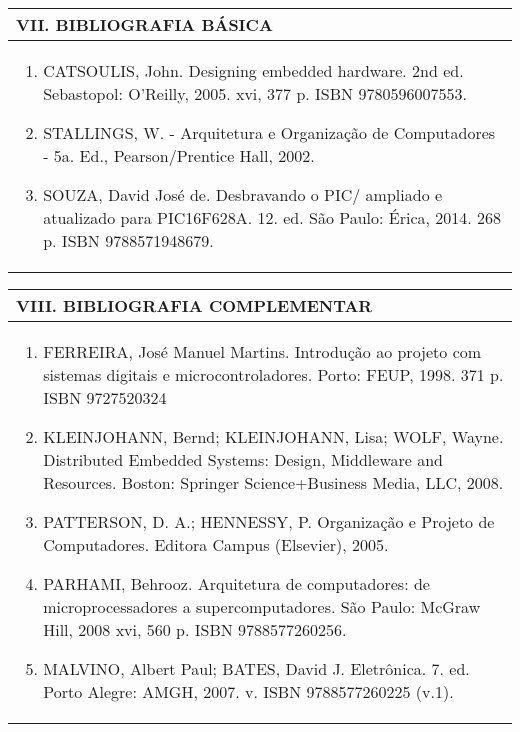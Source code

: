 \documentclass[12pt]{article}
\begin{document}

\begin{longtable}{|L{1.025\textwidth}|} \hline
%
{\bf VII. BIBLIOGRAFIA BÁSICA} \\ \hline
\begin{enumerate}
%
\item CATSOULIS, John. Designing embedded hardware. 2nd ed. Sebastopol: O'Reilly, 2005. xvi, 377 p. ISBN 9780596007553. 
\item STALLINGS, W. - Arquitetura e Organização de Computadores - 5a. Ed., Pearson/Prentice Hall, 2002. 
\item SOUZA, David José de. Desbravando o PIC/ ampliado e atualizado para PIC16F628A. 12. ed. São Paulo: Érica, 2014. 268 p. ISBN 9788571948679.
\end{enumerate}
 \\ \hline
\end{longtable}



\begin{longtable}{|L{1.025\textwidth}|} \hline
%
{\bf VIII. BIBLIOGRAFIA COMPLEMENTAR} \\ \hline
\begin{enumerate}
\item FERREIRA, José Manuel Martins. Introdução ao projeto com sistemas digitais e microcontroladores. Porto: FEUP, 1998. 371 p. ISBN 9727520324 
\item KLEINJOHANN, Bernd; KLEINJOHANN, Lisa; WOLF, Wayne. Distributed Embedded Systems: Design, Middleware and Resources. Boston: Springer Science+Business Media, LLC, 2008. 
\item PATTERSON, D. A.; HENNESSY, P. Organização e Projeto de Computadores. Editora Campus (Elsevier), 2005. 
\item PARHAMI, Behrooz. Arquitetura de computadores: de microprocessadores a supercomputadores. São Paulo: McGraw Hill, 2008 xvi, 560 p. ISBN 9788577260256. 
\item MALVINO, Albert Paul; BATES, David J. Eletrônica. 7. ed. Porto Alegre: AMGH, 2007. v. ISBN 9788577260225 (v.1).
\end{enumerate}
 \\ \hline
\end{longtable}



\end{document}
